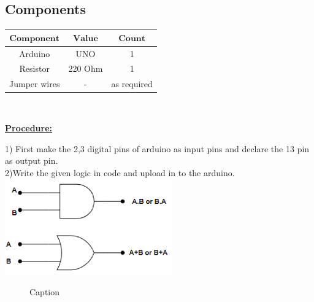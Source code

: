 \documentclass[letterpaper, 10 pt, conference]{ieeeconf}
\begin{document}
\begin{left}
\section{Components}\hfill\break
{
\centering
\begin{tabular}{|c|c|c|}
\hline
$\boldsymbol{Component}$&$\boldsymbol{Value}$&$\boldsymbol{Count}$\\
\hline
Arduino&UNO&1\\
\hline
\hline
Resistor&220 Ohm&1\\
\hline
Jumper wires&-&as required\\
\hline
\end{tabular}\par
}
\vspace{5mm}
\\ \raggedright \textbf{\underline{Procedure:}}\vspace{2mm}
\\ \raggedright 1) First make the 2,3 digital pins of arduino as input pins and declare the 13 pin as output pin.
\\ 2)Write the given logic in code and upload in to the arduino.
    \includegraphics{pic.png}
\vspace{5cm}
\begin{figure}

    \centering
    

    \caption{Caption}
    \label{fig:my_label}
\end{figure}
\vspace{5mm}



\end{left}
\end{document}
